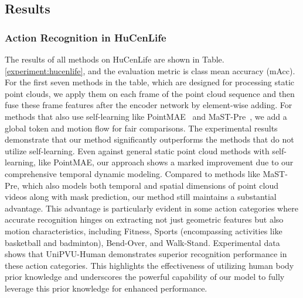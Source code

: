 \subsection{Results}
\subsubsection{Action Recognition in HuCenLife}

The results of all methods on HuCenLife are shown in Table.\ref{experiment:hucenlife}, and the evaluation metric is class mean accuracy (mAcc). For the first seven methods in the table, which are designed for processing static point clouds, we apply them on each frame of the point cloud sequence and then fuse these frame features after the encoder network by element-wise adding. For methods that also use self-learning like PointMAE~\cite{pang2022masked} and MaST-Pre~\cite{shen2023masked}, we add a global token and motion flow for fair comparisons. The experimental results demonstrate that our method significantly outperforms the methods that do not utilize self-learning. Even against general static point cloud methods with self-learning, like PointMAE, our approach shows a marked improvement due to our comprehensive temporal dynamic modeling. Compared to methods like MaST-Pre, which also models both temporal and spatial dimensions of point cloud videos along with mask prediction, our method still maintains a substantial advantage. This advantage is particularly evident in some action categories where accurate recognition hinges on extracting not just geometric features but also motion characteristics, including Fitness, Sports (encompassing activities like basketball and badminton), Bend-Over, and Walk-Stand. Experimental data shows that UniPVU-Human demonstrates superior recognition performance in these action categories. This highlights the effectiveness of utilizing human body prior knowledge and underscores the powerful capability of our model to fully leverage this prior knowledge for enhanced performance.

